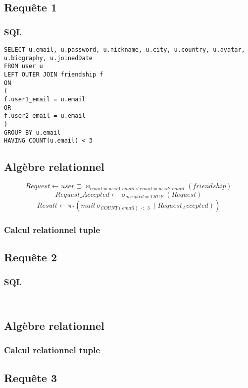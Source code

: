 \documentclass[a4paper,10pt]{article}
\begin{document}
\subsection{Requête 1}
\subsubsection{SQL}
\begin{verbatim}
SELECT u.email, u.password, u.nickname, u.city, u.country, u.avatar, u.biography, u.joinedDate 
FROM user u
LEFT OUTER JOIN friendship f
ON
(
f.user1_email = u.email 
OR 
f.user2_email = u.email
)
GROUP BY u.email
HAVING COUNT(u.email) < 3
\end{verbatim}
\subsection{Algèbre relationnel}
$$Request \leftarrow user\sqsupset\Join_{email=user1\_email \vee email=user2\_email}( friendship)$$
$$Request\_Accepted \leftarrow\ \sigma_{accepted=TRUE}\ (Request)$$
$$Result \leftarrow \pi_* (mail\ \sigma_{COUNT(email)\ <\ 3}\ (Request_Accepted) )$$
\subsubsection{Calcul relationnel tuple}


\subsection{Requête 2}
\subsubsection{SQL}
\begin{verbatim}


\end{verbatim}
\subsection{Algèbre relationnel}

\subsubsection{Calcul relationnel tuple}

\subsection{Requête 3}
\end{document}
